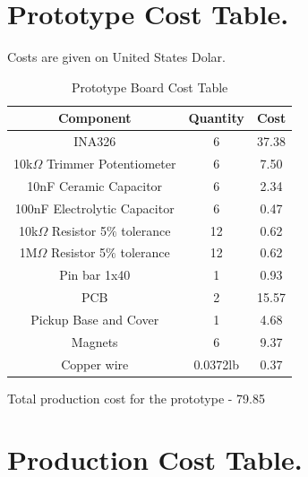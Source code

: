\chapter{Prototype Cost Table.}

Costs are given on United States Dolar.\\
\begin{table}[htb]
  \begin{center}
    \ABNTEXreducedfont
    \caption[Prototype Board Cost Table]{Prototype Board Cost Table}
    \label{Prototype-cost}
    \begin{tabular}{c|c|c}
      \textbf{Component} & \textbf{Quantity} & \textbf{Cost} \\
    \hline
    \hline
    INA326 & 6 & 37.38\\ \hline
    10k$\Omega$ Trimmer Potentiometer & 6 & 7.50 \\ \hline
    10nF Ceramic Capacitor & 6 & 2.34 \\ \hline
    100nF Electrolytic Capacitor & 6 & 0.47 \\ \hline
    10k$\Omega$ Resistor 5$\%$ tolerance & 12 & 0.62 \\ \hline
    1M$\Omega$ Resistor 5$\%$ tolerance & 12 & 0.62 \\ \hline
    Pin bar 1x40 & 1 & 0.93 \\ \hline
    PCB & 2 & 15.57 \\ \hline
    Pickup Base and Cover & 1 & 4.68 \\ \hline
    Magnets & 6 & 9.37 \\ \hline
    Copper wire & 0.0372lb & 0.37 \\ \hline
  \end{tabular}
\end{center}
\end{table}

Total production cost for the prototype - 79.85

\chapter{Production Cost Table.}

